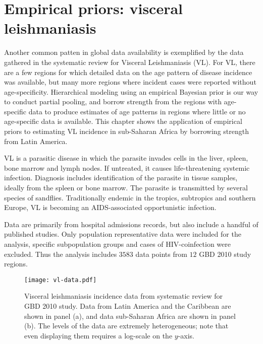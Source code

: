 \chapter{Empirical priors: visceral leishmaniasis}
\label{applications-priors_empirical}

Another common patten in global data availability is exemplified by
the data gathered in the systematic review for Visceral Leishmaniasis
(VL).  For VL, there are a few regions for which detailed data on the
age pattern of disease incidence was available, but many more regions
where incident cases were reported without age-specificity.
Hierarchical modeling using an empirical Bayesian prior is our way to
conduct partial pooling, and borrow strength from the regions with
age-specific data to produce estimates of age patterns in regions
where little or no age-specific data is available.  This chapter shows
the application of empirical priors to estimating VL incidence in
sub-Saharan Africa by borrowing strength from Latin America.

VL is a parasitic disease in which the parasite
invades cells in the liver, spleen, bone marrow and lymph nodes.  If
untreated, it causes life-threatening systemic infection.  Diagnosis
includes identification of the parasite in tissue samples, ideally
from the spleen or bone marrow.  The parasite is transmitted by
several species of sandflies.  Traditionally endemic in the tropics,
subtropics and southern Europe, VL is becoming an AIDS-associated
opportunistic infection. \cite{herwaldt_leishmaniasis_1999,
baron_medical_1996}

Data are primarily from hospital admissions records, but also include
a handful of published studies.  Only population
representative data were included for the analysis, specific
subpopulation groups and cases of HIV-coinfection were excluded.  Thus
the analysis includes $3583$ data points from $12$ GBD 2010 study regions.

    \begin{figure}[h]
        \begin{center}
            \texttt{[image: vl-data.pdf]}
            \caption{Visceral leishmaniasis incidence data from
              systematic review for GBD 2010 study.  Data from Latin
              America and the Caribbean are shown in panel (a), and
              data sub-Saharan Africa are shown in panel (b).  The
              levels of the data are extremely heterogeneous; note
              that even displaying them requires a log-scale on the
              $y$-axis.}
            \label{fig:app-vl data}
        \end{center}
    \end{figure}

